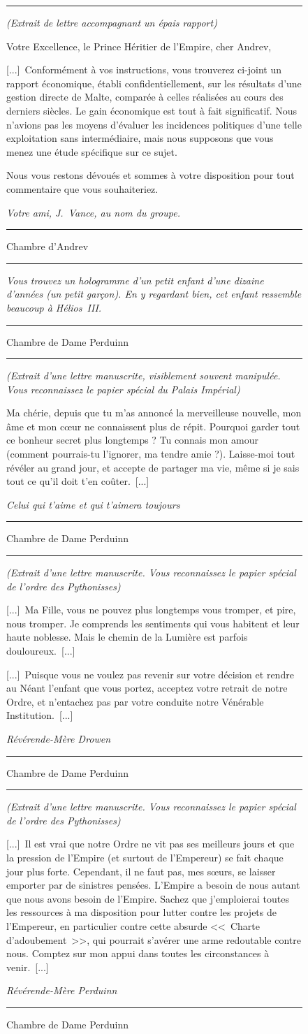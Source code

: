 \documentclass{article}
\newcommand{\newcharacter}{\clearpage\setcounter{figure}{0}}
\newcommand{\indice}[4]{
    \begin{figure}[H]
        \begin{center}
            \rule{0.5\textwidth}{1pt}
        \end{center}
        \begin{framed}
            \begin{samepage}
                \textit{#1}
                \nopagebreak

                #2

                \nopagebreak

                \hfill\textit{#3}
            \end{samepage}
        \end{framed}
        \caption{#4}
        \begin{center}
            \rule{0.5\textwidth}{1pt}
        \end{center}
    \end{figure}
}
\begin{document}
\indice
{(Extrait de lettre accompagnant un épais rapport)}
{Votre Excellence, le Prince Héritier de l'Empire, cher Andrev,

\nobreak

[...]~Conformément à vos instructions, vous trouverez ci-joint un rapport
économique, établi confidentiellement, sur les résultats d'une gestion directe
de Malte, comparée à celles réalisées au cours des derniers siècles. Le gain
économique est tout à fait significatif. Nous n'avions pas les moyens d'évaluer
les incidences politiques d'une telle exploitation sans intermédiaire, mais
nous supposons que vous menez une étude spécifique sur ce sujet.

\nobreak

Nous vous restons dévoués et sommes à votre disposition pour tout commentaire
que vous souhaiteriez.}
{Votre ami, J.~Vance, au nom du groupe.}
{Chambre d'Andrev}

\newcharacter

\indice
{Vous trouvez un hologramme d’un petit enfant d’une dizaine d’années (un petit
garçon). En y regardant bien, cet enfant ressemble beaucoup à Hélios~III.}
{}
{}
{Chambre de Dame Perduinn}

\indice
{(Extrait d’une lettre manuscrite, visiblement souvent manipulée. Vous
reconnaissez le papier spécial du Palais Impérial)}
{Ma chérie, depuis que tu m’as annoncé la merveilleuse nouvelle, mon âme
et mon cœur ne connaissent plus de répit. Pourquoi garder tout ce bonheur
secret plus longtemps ? Tu connais mon amour (comment pourrais-tu l’ignorer,
ma tendre amie ?). Laisse-moi tout révéler au grand jour, et accepte de
partager ma vie, même si je sais tout ce qu’il doit t’en coûter.~[...]}
{Celui qui t’aime et qui t’aimera toujours}
{Chambre de Dame Perduinn}

\indice
{(Extrait d’une lettre manuscrite. Vous reconnaissez le papier spécial de
l’ordre des Pythonisses)}
{[...]~Ma Fille, vous ne pouvez plus longtemps vous tromper, et pire, nous
tromper. Je comprends les sentiments qui vous habitent et leur haute noblesse.
Mais le chemin de la Lumière est parfois douloureux.~[...]

\nobreak

[...]~Puisque vous ne voulez pas revenir sur votre décision et rendre au Néant
l’enfant que vous portez, acceptez votre retrait de notre Ordre, et n’entachez
pas par votre conduite notre Vénérable Institution.~[...]}
{Révérende-Mère Drowen}
{Chambre de Dame Perduinn}

\indice
{(Extrait d’une lettre manuscrite. Vous reconnaissez le papier spécial de
l’ordre des Pythonisses)}
{[...]~Il est vrai que notre Ordre ne vit pas ses meilleurs jours et que la
pression de l’Empire (et surtout de l’Empereur) se fait chaque jour plus forte.
Cependant, il ne faut pas, mes s\oe{}urs, se laisser emporter par de sinistres
pensées. L’Empire a besoin de nous autant que nous avons besoin de l’Empire.
Sachez que j’emploierai toutes les ressources à ma disposition pour lutter
contre les projets de l’Empereur, en particulier contre cette absurde <<~Charte
d’adoubement~>>, qui pourrait s’avérer une arme redoutable contre nous. Comptez
sur mon appui dans toutes les circonstances à venir.~[...]}
{Révérende-Mère Perduinn}
{Chambre de Dame Perduinn}
\end{document}
